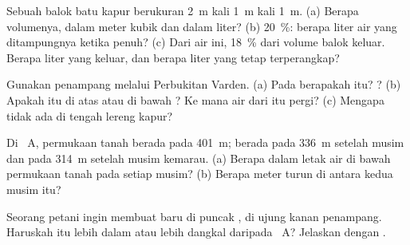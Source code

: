 \begin{exercise}[$\star\star$]\label{exo:g6:water-underground:6}
Sebuah balok batu kapur berukuran 2~m kali 1~m kali 1~m. (a) Berapa
volumenya, dalam meter kubik dan dalam liter? (b)  20~\%: berapa
liter air yang ditampungnya ketika penuh? (c) Dari air ini, 18~\% dari
volume balok keluar. Berapa liter yang keluar, dan berapa liter yang tetap
terperangkap?
\end{exercise}

\begin{exercise}[$\star\star$]\label{exo:g6:water-underground:7}
Gunakan penampang melalui Perbukitan Varden. (a) Pada  berapakah
 itu? ? (b) Apakah  itu di atas atau di bawah
? Ke mana air dari  itu pergi? (c) Mengapa tidak ada 
di tengah lereng  kapur?
\end{exercise}

\begin{exercise}[$\star\star$]\label{exo:g6:water-underground:8}
Di ~A, permukaan tanah berada pada 401~m;  berada pada
336~m setelah musim  dan pada 314~m setelah musim kemarau. (a) Berapa
dalam letak air di bawah permukaan tanah pada setiap musim? (b) Berapa meter
 turun di antara kedua musim itu?
\end{exercise}

\begin{exercise}[$\star\star$]\label{exo:g6:water-underground:9}
Seorang petani ingin membuat  baru di puncak , di ujung kanan
penampang. Haruskah  itu lebih dalam atau lebih dangkal daripada
~A? Jelaskan dengan .
\end{exercise}

